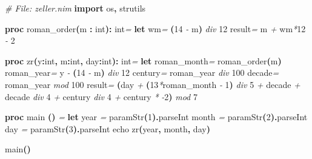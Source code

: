 \documentclass[
  12pt,
]{book}
\newenvironment{Shaded}{}{}
\newcommand{\CommentTok}[1]{\textcolor[rgb]{0.38,0.63,0.69}{\textit{#1}}}
\newcommand{\DataTypeTok}[1]{\textcolor[rgb]{0.56,0.13,0.00}{#1}}
\newcommand{\DecValTok}[1]{\textcolor[rgb]{0.25,0.63,0.44}{#1}}
\newcommand{\KeywordTok}[1]{\textcolor[rgb]{0.00,0.44,0.13}{\textbf{#1}}}
\newcommand{\NormalTok}[1]{#1}
\newcommand{\OtherTok}[1]{\textcolor[rgb]{0.00,0.44,0.13}{#1}}
\newcommand{\StringTok}[1]{\textcolor[rgb]{0.25,0.44,0.63}{#1}}
\begin{document}
\begin{Shaded}
\begin{Highlighting}[]
\CommentTok{\# File: zeller.nim}
\KeywordTok{import}\NormalTok{ os}\KeywordTok{,}\NormalTok{ strutils}

\KeywordTok{proc }\StringTok{roman\_order}\KeywordTok{(}\DataTypeTok{m} \KeywordTok{:} \DataTypeTok{int}\KeywordTok{):} \DataTypeTok{int}\CommentTok{=}
  \KeywordTok{let}\NormalTok{ wm}\CommentTok{=} \KeywordTok{(}\DecValTok{14} \CommentTok{{-}}\NormalTok{ m}\KeywordTok{)} \CommentTok{div} \DecValTok{12}
  \OtherTok{result}\CommentTok{=}\NormalTok{ m }\CommentTok{+}\NormalTok{ wm}\CommentTok{*}\DecValTok{12} \CommentTok{{-}} \DecValTok{2}

\KeywordTok{proc }\StringTok{zr}\KeywordTok{(}\NormalTok{y}\KeywordTok{:}\DataTypeTok{int}\KeywordTok{,}\NormalTok{ m}\KeywordTok{:}\DataTypeTok{int}\KeywordTok{,}\NormalTok{ day}\KeywordTok{:}\DataTypeTok{int}\KeywordTok{):} \DataTypeTok{int}\CommentTok{=}
  \KeywordTok{let}
\NormalTok{    roman\_month}\CommentTok{=} \DataTypeTok{roman\_order}\KeywordTok{(}\NormalTok{m}\KeywordTok{)}
\NormalTok{    roman\_year}\CommentTok{=}\NormalTok{ y }\CommentTok{{-}} \KeywordTok{(}\DecValTok{14} \CommentTok{{-}}\NormalTok{ m}\KeywordTok{)} \CommentTok{div} \DecValTok{12}
\NormalTok{    century}\CommentTok{=}\NormalTok{  roman\_year }\CommentTok{div} \DecValTok{100}
\NormalTok{    decade}\CommentTok{=}\NormalTok{ roman\_year }\CommentTok{mod} \DecValTok{100}
  \OtherTok{result}\CommentTok{=} \KeywordTok{(}\NormalTok{day }\CommentTok{+} \KeywordTok{(}\DecValTok{13}\CommentTok{*}\NormalTok{roman\_month }\CommentTok{{-}} \DecValTok{1}\KeywordTok{)} \CommentTok{div} \DecValTok{5} \CommentTok{+}
\NormalTok{                 decade }\CommentTok{+}\NormalTok{ decade }\CommentTok{div} \DecValTok{4} \CommentTok{+}
\NormalTok{                 century }\CommentTok{div} \DecValTok{4} \CommentTok{+}
\NormalTok{                 century }\CommentTok{*} \CommentTok{{-}}\DecValTok{2}\KeywordTok{)} \CommentTok{mod} \DecValTok{7}

\KeywordTok{proc }\StringTok{main}\CommentTok{ }\KeywordTok{()} \CommentTok{=}
  \KeywordTok{let}
\NormalTok{    year }\CommentTok{=} \DataTypeTok{paramStr}\KeywordTok{(}\DecValTok{1}\KeywordTok{).}\DataTypeTok{parseInt}
\NormalTok{    month }\CommentTok{=} \DataTypeTok{paramStr}\KeywordTok{(}\DecValTok{2}\KeywordTok{).}\DataTypeTok{parseInt}
\NormalTok{    day }\CommentTok{=} \DataTypeTok{paramStr}\KeywordTok{(}\DecValTok{3}\KeywordTok{).}\DataTypeTok{parseInt}
  \DataTypeTok{echo} \DataTypeTok{zr}\KeywordTok{(}\NormalTok{year}\KeywordTok{,}\NormalTok{ month}\KeywordTok{,}\NormalTok{ day}\KeywordTok{)}

\DataTypeTok{main}\KeywordTok{()}
\end{Highlighting}
\end{Shaded}
\end{document}
